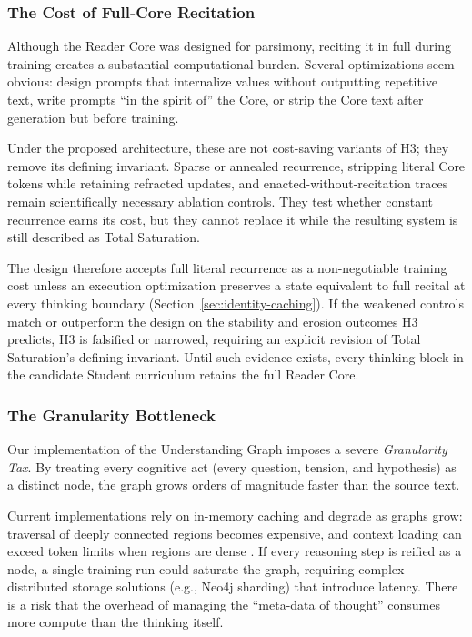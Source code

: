 \subsubsection{The Cost of Full-Core Recitation}

Although the Reader Core was designed for parsimony, reciting it in full during training creates a substantial computational burden. Several optimizations seem obvious: design prompts that internalize values without outputting repetitive text, write prompts ``in the spirit of'' the Core, or strip the Core text after generation but before training.

Under the proposed architecture, these are not cost-saving variants of H3; they
remove its defining invariant. Sparse or annealed recurrence, stripping literal
Core tokens while retaining refracted updates, and
enacted-without-recitation traces remain scientifically necessary ablation
controls. They test whether constant recurrence earns its cost, but they cannot
replace it while the resulting system is still described as Total Saturation.

The design therefore accepts full literal recurrence as a non-negotiable
training cost unless an execution optimization preserves a state equivalent to
full recital at every thinking boundary (Section~\ref{sec:identity-caching}). If
the weakened controls match or outperform the design on the stability and
erosion outcomes H3 predicts, H3 is falsified or narrowed, requiring an explicit
revision of Total Saturation's defining invariant.
Until such evidence exists, every thinking block in the candidate Student
curriculum retains the full Reader Core.

\subsubsection{The Granularity Bottleneck}

Our implementation of the Understanding Graph imposes a severe \emph{Granularity Tax}. By treating every cognitive act (every question, tension, and hypothesis) as a distinct node, the graph grows orders of magnitude faster than the source text.

Current implementations rely on in-memory caching and degrade as graphs grow: traversal of deeply connected regions becomes expensive, and context loading can exceed token limits when regions are dense \cite{westerberg2026understanding}. If every reasoning step is reified as a node, a single training run could saturate the graph, requiring complex distributed storage solutions (e.g., Neo4j sharding) that introduce latency. There is a risk that the overhead of managing the ``meta-data of thought'' consumes more compute than the thinking itself.

